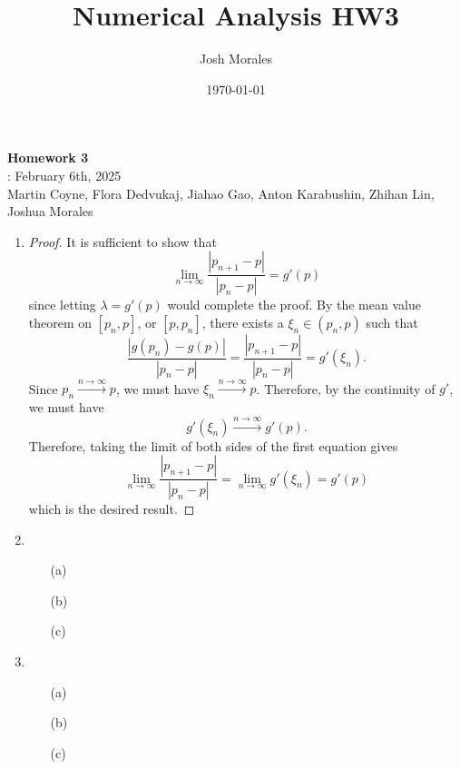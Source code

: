 \documentclass[12pt]{article}
\title{Numerical Analysis HW3}
\author{Josh Morales}
\date{\today}
\begin{document}
\pagestyle{fancy}
\begin{center}
\textbf{\Large Homework 3} \\
: February 6th, 2025\\
Martin Coyne, Flora Dedvukaj, Jiahao Gao, Anton Karabushin, Zhihan Lin, Joshua Morales
\end{center}
\begin{enumerate}[leftmargin=2em]
    \item
	\begin{proof}
	  It is sufficient to show that 
	  \[\lim_{n\to \infty}\frac{|p_{n+1}-p|}{|p_{n}-p|}=g'(p)\]
	  since letting $\lambda = g'(p)$ would complete the proof. By the mean value theorem on $[p_n,p]$, or $[p,p_n]$, there exists a $\xi_n\in (p_n,p)$ such that
	   \[
		 \frac{|g(p_n)-g(p)|}{|p_n-p|}=\frac{|p_{n+1}-p|}{|p_{n}-p|}= g'(\xi_n)
	  .\] 
	  Since $p_n \xrightarrow{n\to \infty} p$, we must have	$\xi_{n}\xrightarrow{n\to \infty} p$. Therefore, by the continuity of $g'$, we must have 
	  \[g'(\xi_n)\xrightarrow{n\to \infty} g'(p).\] 
	  Therefore, taking the limit of both sides of the first equation gives
	  \[\lim_{n\to \infty } \frac{|p_{n+1}-p|}{|p_{n}-p|}=\lim_{n\to \infty} g'(\xi_n)=g'(p)\]
	  which is the desired result.
	\end{proof}
    \item 
    \begin{enumerate}
        \item[(a)]
        
        \item[(b)]
        
        \item[(c)]  
    \end{enumerate}


    \item
    \begin{enumerate}
        \item[(a)] 
        
        \item[(b)]
        
        \item[(c)]
    \end{enumerate}
    

\end{enumerate}
\end{document}
